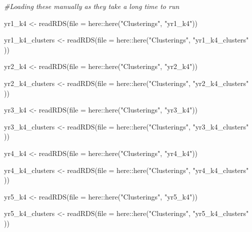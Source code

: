 \documentclass[
]{article}
\newenvironment{Shaded}{\begin{snugshade}}{\end{snugshade}}
\newcommand{\AttributeTok}[1]{\textcolor[rgb]{0.77,0.63,0.00}{#1}}
\newcommand{\CommentTok}[1]{\textcolor[rgb]{0.56,0.35,0.01}{\textit{#1}}}
\newcommand{\FunctionTok}[1]{\textcolor[rgb]{0.00,0.00,0.00}{#1}}
\newcommand{\NormalTok}[1]{#1}
\newcommand{\OtherTok}[1]{\textcolor[rgb]{0.56,0.35,0.01}{#1}}
\newcommand{\SpecialCharTok}[1]{\textcolor[rgb]{0.00,0.00,0.00}{#1}}
\newcommand{\StringTok}[1]{\textcolor[rgb]{0.31,0.60,0.02}{#1}}
\begin{document}
\begin{Shaded}
\begin{Highlighting}[]
\CommentTok{\#Loading these manually as they take a long time to run}

\NormalTok{yr1\_k4          }\OtherTok{\textless{}{-}} \FunctionTok{readRDS}\NormalTok{(}\AttributeTok{file =}\NormalTok{ here}\SpecialCharTok{::}\FunctionTok{here}\NormalTok{(}\StringTok{"Clusterings"}\NormalTok{, }\StringTok{"yr1\_k4"}\NormalTok{))}
     
\NormalTok{yr1\_k4\_clusters }\OtherTok{\textless{}{-}} \FunctionTok{readRDS}\NormalTok{(}\AttributeTok{file =}\NormalTok{ here}\SpecialCharTok{::}\FunctionTok{here}\NormalTok{(}\StringTok{"Clusterings"}\NormalTok{, }\StringTok{"yr1\_k4\_clusters"}\NormalTok{ ))}

\NormalTok{yr2\_k4          }\OtherTok{\textless{}{-}} \FunctionTok{readRDS}\NormalTok{(}\AttributeTok{file =}\NormalTok{ here}\SpecialCharTok{::}\FunctionTok{here}\NormalTok{(}\StringTok{"Clusterings"}\NormalTok{, }\StringTok{"yr2\_k4"}\NormalTok{))}
     
\NormalTok{yr2\_k4\_clusters }\OtherTok{\textless{}{-}} \FunctionTok{readRDS}\NormalTok{(}\AttributeTok{file =}\NormalTok{ here}\SpecialCharTok{::}\FunctionTok{here}\NormalTok{(}\StringTok{"Clusterings"}\NormalTok{, }\StringTok{"yr2\_k4\_clusters"}\NormalTok{ )) }

\NormalTok{yr3\_k4          }\OtherTok{\textless{}{-}} \FunctionTok{readRDS}\NormalTok{(}\AttributeTok{file =}\NormalTok{ here}\SpecialCharTok{::}\FunctionTok{here}\NormalTok{(}\StringTok{"Clusterings"}\NormalTok{, }\StringTok{"yr3\_k4"}\NormalTok{))}
     
\NormalTok{yr3\_k4\_clusters }\OtherTok{\textless{}{-}} \FunctionTok{readRDS}\NormalTok{(}\AttributeTok{file =}\NormalTok{ here}\SpecialCharTok{::}\FunctionTok{here}\NormalTok{(}\StringTok{"Clusterings"}\NormalTok{, }\StringTok{"yr3\_k4\_clusters"}\NormalTok{ )) }

\NormalTok{yr4\_k4          }\OtherTok{\textless{}{-}} \FunctionTok{readRDS}\NormalTok{(}\AttributeTok{file =}\NormalTok{ here}\SpecialCharTok{::}\FunctionTok{here}\NormalTok{(}\StringTok{"Clusterings"}\NormalTok{, }\StringTok{"yr4\_k4"}\NormalTok{))}
     
\NormalTok{yr4\_k4\_clusters }\OtherTok{\textless{}{-}} \FunctionTok{readRDS}\NormalTok{(}\AttributeTok{file =}\NormalTok{ here}\SpecialCharTok{::}\FunctionTok{here}\NormalTok{(}\StringTok{"Clusterings"}\NormalTok{, }\StringTok{"yr4\_k4\_clusters"}\NormalTok{ )) }

\NormalTok{yr5\_k4          }\OtherTok{\textless{}{-}} \FunctionTok{readRDS}\NormalTok{(}\AttributeTok{file =}\NormalTok{ here}\SpecialCharTok{::}\FunctionTok{here}\NormalTok{(}\StringTok{"Clusterings"}\NormalTok{, }\StringTok{"yr5\_k4"}\NormalTok{))}
     
\NormalTok{yr5\_k4\_clusters }\OtherTok{\textless{}{-}} \FunctionTok{readRDS}\NormalTok{(}\AttributeTok{file =}\NormalTok{ here}\SpecialCharTok{::}\FunctionTok{here}\NormalTok{(}\StringTok{"Clusterings"}\NormalTok{, }\StringTok{"yr5\_k4\_clusters"}\NormalTok{ )) }
\end{Highlighting}
\end{Shaded}
\end{document}
